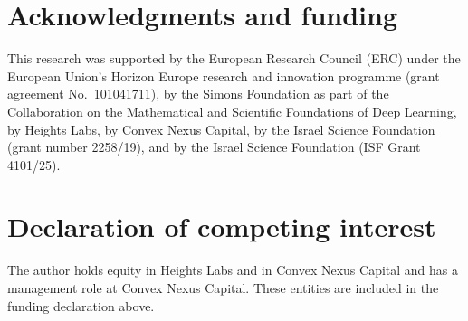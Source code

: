 \documentclass[11pt]{amsart}
\theoremstyle{definition}
\begin{document}
\section*{Acknowledgments and funding}

This research was supported by the European Research Council (ERC) under the European Union's Horizon Europe research and innovation programme (grant agreement No.~101041711), by the Simons Foundation as part of the Collaboration on the Mathematical and Scientific Foundations of Deep Learning, by Heights Labs, by Convex Nexus Capital, by the Israel Science Foundation (grant number 2258/19), and by the Israel Science Foundation (ISF Grant 4101/25).

\section*{Declaration of competing interest}

The author holds equity in Heights Labs and in Convex Nexus Capital and has a management role at Convex Nexus Capital. These entities are included in the funding declaration above.
\end{document}
